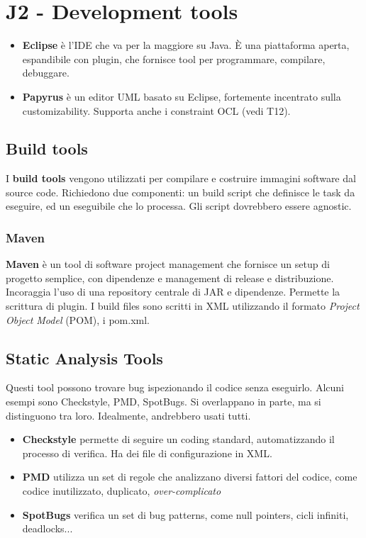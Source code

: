\documentclass[11pt]{article}
\begin{document}
\section{J2 - Development tools}
\begin{itemize}
    \item \textbf{Eclipse} è l'IDE che va per la maggiore su Java. È una piattaforma aperta, espandibile con plugin, che fornisce tool per programmare, compilare, debuggare. 
    \item \textbf{Papyrus} è un editor UML basato su Eclipse, fortemente incentrato sulla customizability. Supporta anche i constraint OCL (vedi T12).
\end{itemize}
\subsection{Build tools}
I \textbf{build tools} vengono utilizzati per compilare e costruire immagini software dal source code. Richiedono due componenti: un build script che definisce le task da eseguire, ed un eseguibile che lo processa. Gli script dovrebbero essere \gls{agnostic}.
\subsubsection{Maven}
\textbf{Maven} è un tool di software project management che fornisce un setup di progetto semplice, con dipendenze e management di release e distribuzione. Incoraggia l'uso di una repository centrale di JAR e dipendenze. Permette la scrittura di plugin. I build files sono scritti in XML utilizzando il formato \textit{Project Object Model} (POM), i pom.xml.
\subsection{Static Analysis Tools}
Questi tool possono trovare bug ispezionando il codice senza eseguirlo. Alcuni esempi sono Checkstyle, PMD, SpotBugs. Si overlappano in parte, ma si distinguono tra loro. Idealmente, andrebbero usati tutti. 
\begin{itemize}
    \item \textbf{Checkstyle} permette di seguire un coding standard, automatizzando il processo di verifica. Ha dei file di configurazione in XML.
    \item \textbf{PMD} utilizza un set di regole che analizzano diversi fattori del codice, come codice inutilizzato, duplicato, \textit{over-complicato}
    \item  \textbf{SpotBugs} verifica un set di bug patterns, come null pointers, cicli infiniti, deadlocks...
\end{itemize}
\end{document}
